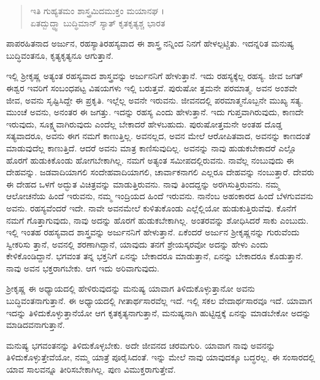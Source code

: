 \begin{verse}
ಇತಿ ಗುಹ್ಯತಮಂ ಶಾಸ್ತ್ರಮಿದಮುಕ್ತಂ ಮಯಾನಘ ।\\ಏತದ್ಬುದ್ಧ್ವಾ ಬುದ್ಧಿಮಾನ್ ಸ್ಯಾತ್ ಕೃತಕೃತ್ಯಶ್ಚ ಭಾರತ 
\end{verse}

{\small ಪಾಪರಹಿತನಾದ ಅರ್ಜುನ, ರಹಸ್ಯಾತಿರಹಸ್ಯವಾದ ಈ ಶಾಸ್ತ್ರ ನನ್ನಿಂದ ನಿನಗೆ ಹೇಳಲ್ಪಟ್ಚಿತು. ಇದನ್ನರಿತ ಮನುಷ್ಯ ಬುದ್ಧಿವಂತನೂ, ಕೃತ್ಯಕೃತ್ಯನೂ ಆಗುತ್ತಾನೆ.}

ಇಲ್ಲಿ ಶ್ರೀಕೃಷ್ಣ ಅತ್ಯಂತ ರಹಸ್ಯವಾದ ಶಾಸ್ತ್ರವನ್ನು ಅರ್ಜುನನಿಗೆ ಹೇಳುತ್ತಾನೆ. ಇದು ರಹಸ್ಯಕ್ಕೆಲ್ಲ ರಹಸ್ಯ. ಜೀವ ಜಗತ್ ಈಶ್ವರ ಇವರಿಗೆ ಸಂಬಂಧಪಟ್ಟ ವಿಷಯಗಳು ಇಲ್ಲಿ ಬರುತ್ತವೆ. ಪುರುಷೋ ತ್ತಮನೇ ಪರಮಾತ್ಮ. ಅವನ ಅಂಶವೇ ಜೀವ, ಅವನು ಸೃಷ್ಟಿಸಿದ್ದೇ ಈ ಪ್ರಕೃತಿ. ಇಲ್ಲೆಲ್ಲ ಅವನೇ ಇರುವನು. ಜೀವನದಲ್ಲಿ ಪರಮಾತ್ಮನೊಬ್ಬನೇ ಮುಖ್ಯ ಸತ್ಯ. ಮುಂಚೆ ಅವನು, ಅನಂತರ ಈ ಜಗತ್ತು. ಇದನ್ನು ರಹಸ್ಯ ಎಂದು ಹೇಳುತ್ತಾನೆ. ಇದು ಗುಪ್ತವಾಗಿರುವುದು, ಕಾಣದೇ ಇರುವುದು, ಸೂಕ್ಷ್ಮವಾಗಿರುವುದು ಎಂದೆಲ್ಲ ಬೇಕಾದರೆ ಹೇಳಬಹುದು. ಪುರುಷೋತ್ತಮನೇ ಅಂತಹ ದೊಡ್ಡ ಸತ್ಯವಾದರೂ, ಅವನು ಈಗ ನಮಗೆ ಕಾಣುತ್ತಿಲ್ಲ. ಅವನಲ್ಲದ, ಅವನ ಮೇಲೆ ಆರೋಪಿತವಾದ, ಅವನನ್ನು ಕಾಣದಂತೆ ಮಾಡುವುದೆಲ್ಲ ಕಾಣುತ್ತಿದೆ. ಆದರೆ ಅವನು ಮಾತ್ರ ಕಾಣಿಸುವುದಿಲ್ಲ. ಅವನನ್ನು ನಾವು ಹುಡುಕಬೇಕಾದರೆ ಎಲ್ಲೊ ಹೊರಗೆ ಹುಡುಕಿಕೊಂಡು ಹೋಗಬೇಕಾಗಿಲ್ಲ. ನಮಗೆ ಅತ್ಯಂತ ಸಮೀಪದಲ್ಲಿರುವನು. ನಾವೆಲ್ಲ ನಂಬುವುದು ಈ ದೇಹವನ್ನು. ಜಡವಾದಿಯಾಗಲಿ ಸಂದೇಹವಾದಿಯಾಗಲಿ, ಚಾರ್ವಾಕನಾಗಲಿ ಎಲ್ಲರೂ ದೇಹವನ್ನು ನಂಬುತ್ತಾರೆ. ದೇವರು ಈ ದೇಹದ ಒಳಗೆ ಅದ್ಭುತ ವಿಚಿತ್ರವನ್ನು ಮಾಡುತ್ತಿರುವನು. ನಾವು ತಿಂದದ್ದನ್ನು ಅರಗಿಸುತ್ತಿರುವನು. ನಮ್ಮ ಆಲೋಚನೆಯ ಹಿಂದೆ ಇರುವನು, ನಮ್ಮ ಇಂದ್ರಿಯದ ಹಿಂದೆ ಇರುವನು. ನಾನೆಂಬ ಅಹಂಕಾರದ ಹಿಂದೆ ಬೆಳಗುವವನು ಅವನು. ರಹಸ್ಯವೆಂದರೆ ಇದೇ. ನಾವೇ ಅವನಮೇಲೆ ಕುಳಿತುಕೊಂಡು ಎಲ್ಲೆಲ್ಲಿಯೋ ಹುಡುಕುತ್ತಿರುವೆವು. ಕೊನೆಗೆ ನಮಗೆ ಗೊತ್ತಾಗುವುದು, ನಾವು ಅದನ್ನು ಹೊರಗೆ ಹುಡುಕಬೇಕಾಗಿಲ್ಲ. ಅಂತರವನ್ನು ಶೋಧಿಸಿದರೆ ಸಾಕು ಎಂಬುದು. ಇಲ್ಲಿ ಇಂತಹ ರಹಸ್ಯವಾದ ಶಾಸ್ತ್ರವನ್ನು ಅರ್ಜುನನಿಗೆ ಹೇಳುತ್ತಾನೆ. ಏಕೆಂದರೆ ಅರ್ಜುನ ಶ್ರೀಕೃಷ್ಣನನ್ನು ಗುರುವೆಂದು ಸ್ವೀಕರಿಸು ತ್ತಾನೆ, ಅವನಲ್ಲಿ ಶರಣಾಗಿದ್ದಾನೆ, ಯಾವುದು ತನಗೆ ಶ್ರೇಯಸ್ಕರವೋ ಅದನ್ನು ಹೇಳು ಎಂದು ಕೇಳಿಕೊಂಡಿದ್ದಾನೆ. ಭಗವಂತ ತನ್ನ ಭಕ್ತನಿಗೆ ಏನನ್ನು ಬೇಕಾದರೂ ಮಾಡುತ್ತಾನೆ, ಏನನ್ನು ಬೇಕಾದರೂ ಕೊಡುತ್ತಾನೆ. ನಾವು ಅವನ ಭಕ್ತರಾಗಬೇಕು. ಆಗ ಇದು ಅರಿವಾಗುವುದು.

ಶ್ರೀಕೃಷ್ಣ ಈ ಅಧ್ಯಾಯದಲ್ಲಿ ಹೇಳಿರುವುದನ್ನು ಮನುಷ್ಯ ಯಾವಾಗ ತಿಳಿದುಕೊಳ್ಳುತ್ತಾನೋ ಅವನು ಬುದ್ಧಿವಂತನಾಗುತ್ತಾನೆ. ಈ ಅಧ್ಯಾಯದಲ್ಲಿ ಗೀತಾರ್ಥಸಾರವೆಲ್ಲ ಇದೆ. ಇಲ್ಲಿ ಸಕಲ ವೇದಾರ್ಥಸಾರವೂ ಇದೆ. ಯಾವಾಗ ಇದನ್ನು ತಿಳಿದುಕೊಳ್ಳುತ್ತಾನೆಯೋ ಆಗ ಕೃತಕೃತ್ಯನಾಗುತ್ತಾನೆ, ಮನುಷ್ಯನಾಗಿ ಹುಟ್ಟಿದ್ದಕ್ಕೆ ಏನನ್ನು ಮಾಡಬೇಕೋ ಅದನ್ನು ಮಾಡಿದವನಾಗುತ್ತಾನೆ.

ಮನುಷ್ಯ ಭಗವಂತನನ್ನು ತಿಳಿದುಕೊಳ್ಳಬೇಕು. ಅದೇ ಜೀವನದ ಚರಮಗುರಿ. ಯಾವಾಗ ನಾವು ಅವನನ್ನು ತಿಳಿದುಕೊಳ್ಳುತ್ತೇವೆಯೋ, ನಮ್ಮ ಯಾತ್ರೆ ಪೂರೈಸಿದಂತೆ. ಇನ್ನು ಮೇಲೆ ನಾವು ಯಾವುದಕ್ಕೂ ಬದ್ಧರಲ್ಲ. ಈ ಸಂಸಾರದಲ್ಲಿ ಯಾವ ಸಾಲವನ್ನೂ ತೀರಿಸಬೇಕಾಗಿಲ್ಲ. ಪುಣ ವಿಮುಕ್ತರಾಗುತ್ತೇವೆ.

